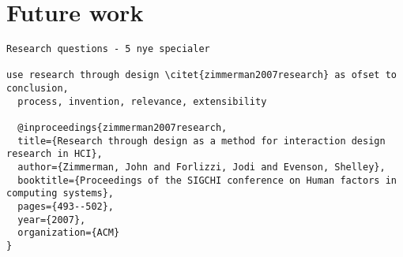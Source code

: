 
\section{Future work}


\begin{verbatim}
Research questions - 5 nye specialer

use research through design \citet{zimmerman2007research} as ofset to conclusion,
  process, invention, relevance, extensibility 

  @inproceedings{zimmerman2007research,
  title={Research through design as a method for interaction design research in HCI},
  author={Zimmerman, John and Forlizzi, Jodi and Evenson, Shelley},
  booktitle={Proceedings of the SIGCHI conference on Human factors in computing systems},
  pages={493--502},
  year={2007},
  organization={ACM}
}
\end{verbatim}


